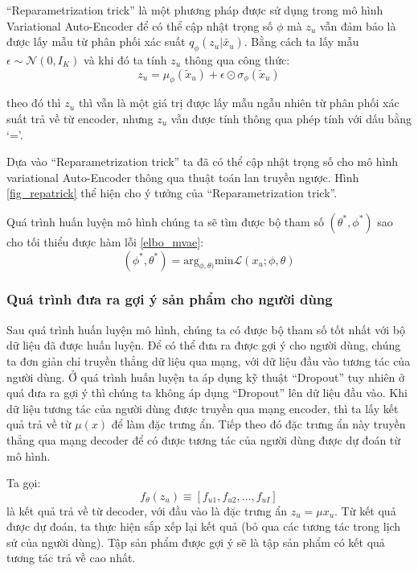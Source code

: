     ``Reparametrization trick'' là một phương pháp được sử dụng trong mô hình Variational Auto-Encoder để có thể cập nhật trọng số $\phi$ mà $z_u$ vẫn đảm bảo là được lấy mẫu từ phân phối xác suất $q_\phi(z_u|\tilde{x_u})$. 
    Bằng cách ta lấy mẫu $\epsilon \sim \mathcal{N}(0,I_K)$ và khi đó ta tính $z_u$ thông qua công thức:
    \begin{equation}
        z_u = \mu_\phi(\tilde{x}_u) + \epsilon \odot \sigma_\phi(\tilde{x}_u)
    \end{equation}

    theo đó thì $z_u$ thì vẫn là một giá trị được lấy mẫu ngẫu nhiên từ phân phối xác suất trả về từ encoder, nhưng $z_u$ vẫn được tính thông qua phép tính với dấu bằng `='.
    
    Dựa vào ``Reparametrization trick'' ta đã có thể cập nhật trọng số cho mô hình variational Auto-Encoder thông qua thuật toán lan truyền ngược. 
    Hình \ref{fig_repatrick} thể hiện cho ý tưởng của ``Reparametrization trick''.

    Quá trình huấn luyện mô hình chúng ta sẽ tìm được bộ tham số $(\theta^*, \phi^*)$ sao cho tối thiểu được hàm lỗi \ref{elbo_mvae}:
    \begin{equation}
        \label{vae_w}
        (\phi^*,\theta^*) = \text{arg}_{\phi,\theta)} \text{min} \mathcal{L}(x_u;\phi,\theta)
    \end{equation}

    \subsubsection{Quá trình đưa ra gợi ý sản phẩm cho người dùng}
    Sau quá trình huấn luyện mô hình, chúng ta có được bộ tham số tốt nhất với bộ dữ liệu đã được huấn luyện.
    Để có thể đưa ra được gợi ý cho người dùng, chúng ta đơn giản chỉ truyền thẳng dữ liệu qua mạng, với dữ liệu đầu vào tương tác của người dùng.
    Ở quá trình huấn luyện ta áp dụng kỹ thuật ``Dropout'' tuy nhiên ở quá đưa ra gợi ý thì chúng ta không áp dụng ``Dropout'' lên dữ liệu đầu vào. 
    Khi dữ liệu tương tác của người dùng được truyền qua mạng encoder, thì ta lấy kết quả trả về từ $\mu(x)$ để làm đặc trưng ẩn.
    Tiếp theo đó đặc trưng ẩn này truyền thẳng qua mạng decoder để có được tương tác của người dùng được dự đoán từ mô hình.
    
    Ta gọi: 
    \begin{equation}
        f_\theta(z_u) \equiv [f_{u1}, f_{u2}, \dots , f_{uI}]
    \end{equation}
    là kết quả trả về từ decoder, với đầu vào là đặc trưng ẩn $z_u = \mu{x_u}$.
    Từ kết quả được dự đoán, ta thực hiện sắp xếp lại kết quả (bỏ qua các tương tác trong lịch sử của người dùng).
    Tập sản phẩm được gợi ý sẽ là tập sản phẩm có kết quả tương tác trả về cao nhất. 


